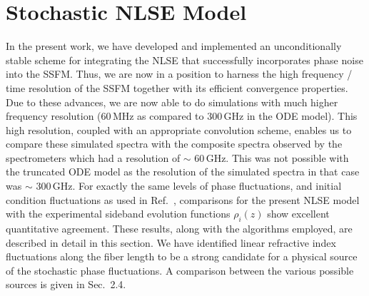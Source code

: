 \section{Stochastic NLSE Model}

In the present work, we have developed and implemented an unconditionally
stable scheme for integrating the NLSE that successfully incorporates phase
noise into the SSFM. Thus, we are now in a position to harness the high
frequency / time resolution of the SSFM together with its efficient
convergence properties. Due to these advances, we are now able to do
simulations with much higher frequency resolution (60\,MHz as compared to
300\,GHz in the ODE model). This high resolution, coupled with an appropriate
convolution scheme, enables us to compare these simulated spectra with the
composite spectra observed by the spectrometers which had a resolution of
$\sim$ 60\,GHz. This was not possible with the truncated ODE model as the
resolution of the simulated spectra in that case was $\sim$ 300\,GHz. For
exactly the same levels of phase fluctuations, and initial condition
fluctuations as used in Ref.\ \cite{hart1}, comparisons for the present NLSE
model with the experimental sideband evolution functions $\rho_i(z)$ show
excellent quantitative agreement. These results, along with the algorithms
employed, are described in detail in this section. We have identified linear
refractive index fluctuations along the fiber length to be a strong candidate
for a physical source of the stochastic phase fluctuations. A comparison
between the various possible sources is given in Sec.\ 2.4.

